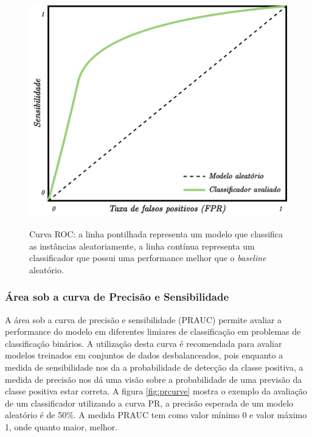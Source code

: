 \begin{figure}[htbp]
	\centering
	\caption[Curva ROC]{Curva ROC: a linha pontilhada representa um modelo que classifica as instâncias aleatoriamente, a linha contínua representa um classificador que possui uma performance melhor que o \textit{baseline} aleatório.}
		\includegraphics[scale=.20]{imagens/auroc.png}
	\label{fig:aucroc}
\end{figure}

\subsubsection{Área sob a curva de Precisão e Sensibilidade}

A área sob a curva de precisão e sensibilidade (PRAUC) permite avaliar a performance do modelo em diferentes limiares de classificação em problemas de classificação binários.
A utilização desta curva é recomendada para avaliar modelos treinados em conjuntos de dados desbalanceados, pois enquanto a medida de sensibilidade nos da a probabilidade de detecção da classe positiva, a medida de precisão nos dá uma visão sobre a probabilidade de uma previsão da classe positiva estar correta. A figura \ref{fig:prcurve} mostra o exemplo da avaliação de um classificador utilizando a curva PR, a precisão esperada de um modelo aleatório é de 50\%. A medida PRAUC tem como valor mínimo 0 e valor máximo 1, onde quanto maior, melhor.

